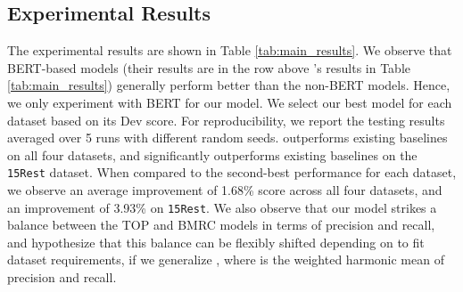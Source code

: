 \documentclass[sigconf]{acmart}
\begin{document}
\begin{table}[ht!]
\begin{table}[ht!]
\caption{ Scores for Multiple and Overlapping Triplets}
\small
\label{tab:multiple_triplets}
\centering
{}
\vspace{-2.4em}
\end{table}
\subsection{Experimental Results}

The experimental results are shown in Table \ref{tab:main_results}. We observe that BERT-based models (their results are in the row above \mymodel{}'s results in Table \ref{tab:main_results}) generally perform better than the non-BERT models. Hence, we only experiment with BERT for our \mymodel{} model. We select our best model for each dataset based on its Dev  score. For reproducibility, we report the testing results averaged over 5 runs with different random seeds. \mymodel{} outperforms existing baselines on all four datasets, and significantly outperforms existing baselines on the \texttt{15Rest} dataset. When compared to the second-best performance for each dataset, we observe an average improvement of 1.68\%  score across all four datasets, and an improvement of 3.93\% on \texttt{15Rest}. We also observe that our model strikes a balance between the TOP and BMRC models in terms of precision and recall, and hypothesize that this balance can be flexibly shifted depending on  to fit dataset requirements, if we generalize , where  is the weighted harmonic mean of precision and recall.



\end{table}
\end{document}
